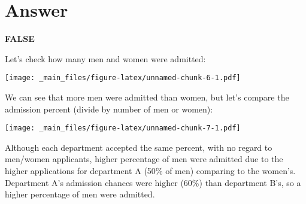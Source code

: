 \documentclass[
]{book}
\begin{document}
\hypertarget{answer-3}{%
\section{Answer}\label{answer-3}}

\textbf{FALSE}

Let's check how many men and women were admitted:

\texttt{[image: \_main\_files/figure-latex/unnamed-chunk-6-1.pdf]}

We can see that more men were admitted than women, but let's compare the admission percent (divide by number of men or women):

\texttt{[image: \_main\_files/figure-latex/unnamed-chunk-7-1.pdf]}

Although each department accepted the same percent, with no regard to men/women applicants, higher percentage of men were admitted due to the higher applications for department A (50\% of men) comparing to the women's. Department A's admission chances were higher (60\%) than department B's, so a higher percentage of men were admitted.
\end{document}
